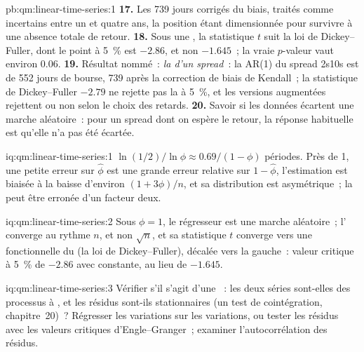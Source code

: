 \begin{solution}{pb:qm:linear-time-series:1}
\textbf{17.} Les 739 jours corrigés du biais, traités comme incertains entre un et quatre ans, la position étant dimensionnée pour survivre à une absence totale de retour.
\textbf{18.} Sous une , la statistique $t$ suit la loi de Dickey--Fuller, dont le point à 5~\% est $-2.86$, et non $-1.645$~; la vraie $p$-valeur vaut environ 0.06.
\textbf{19.} Résultat nommé~: \emph{la  d'un spread}~: la  AR(1) du spread 2s10s est de 552 jours de bourse, 739 après la correction de biais de
Kendall~; la statistique de Dickey--Fuller $-2.79$ ne rejette pas la  à 5~\%, et les versions augmentées rejettent ou non selon le choix des retards.
\textbf{20.} Savoir si les données écartent une marche aléatoire~: pour un spread dont on espère le retour, la réponse habituelle est qu'elle n'a pas été écartée.
\end{solution}

\begin{solution}{iq:qm:linear-time-series:1}
$\ln(1/2)/\ln\phi \approx 0.69/(1 - \phi)$ périodes. Près de 1, une petite erreur sur $\hat\phi$ est une grande erreur relative sur $1 - \hat\phi$, l'estimation est biaisée à la baisse d'environ
$(1 + 3\phi)/n$, et sa distribution est asymétrique~; la  peut être erronée d'un facteur deux.
\end{solution}

\begin{solution}{iq:qm:linear-time-series:2}
Sous $\phi = 1$, le régresseur est une marche aléatoire~; l' converge au rythme $n$, et non $\sqrt n$, et sa statistique $t$ converge vers une fonctionnelle du  (la loi de Dickey--Fuller), décalée vers la gauche~: valeur critique à 5~\% de $-2.86$ avec constante, au lieu de $-1.645$.
\end{solution}

\begin{solution}{iq:qm:linear-time-series:3}
Vérifier s'il s'agit d'une ~: les deux séries sont-elles des processus à , et les résidus sont-ils stationnaires (un test de cointégration, chapitre~20)~? Régresser
les variations sur les variations, ou tester les résidus avec les valeurs critiques d'Engle--Granger~; examiner l'autocorrélation des résidus.
\end{solution}

